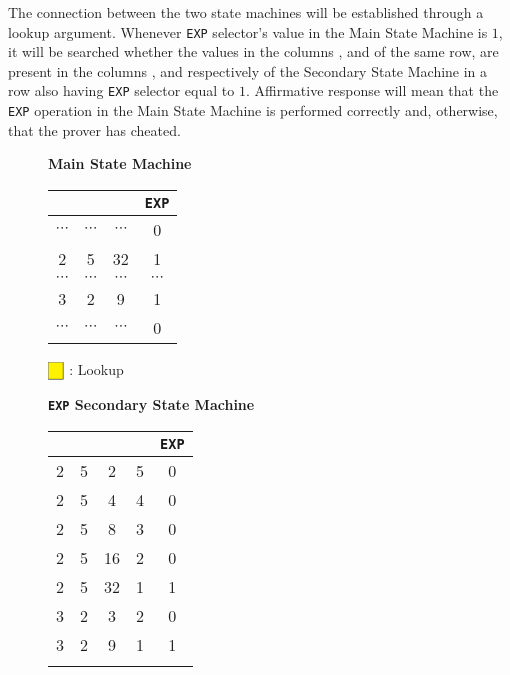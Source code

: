 The connection between the two state machines will be established through a lookup argument. Whenever \texttt{EXP} selector's value in the Main State Machine is $1$, it will be searched whether the values in the columns \A, \B and \C of the same row, are present in the columns \A, \B and \C respectively of the Secondary State Machine in a row also having \texttt{EXP} selector equal to $1$. Affirmative response will mean that the \texttt{EXP} operation in the Main State Machine is performed correctly and, otherwise, that the prover has cheated.

\begin{figure}[ht]
\begin{minipage}[t]{0.5\linewidth}
\centering
\textbf{Main State Machine} \\
\vspace{1em}
\begin{tabular}{|c|c|c|c|}
\hline
\A &  \B & \C &  \texttt{EXP}\\
\hline
$\cdots$ & $\cdots$ & $\cdots$ & 0 \\ \hline
2  \cellcolor{yellow} & 5 \cellcolor{yellow} &
32 \cellcolor{yellow} & 1 \cellcolor{yellow} \\
\hline
$\cdots$ & $\cdots$ & $\cdots$ & $\cdots$ \\ \hline
3  \cellcolor{yellow} & 2 \cellcolor{yellow} & 9
\cellcolor{yellow} & 1 \cellcolor{yellow} \\ \hline
$\cdots$ & $\cdots$ & $\cdots$ & 0 \\ \hline
\end{tabular}
\vspace{1em}
\begin{flushleft} \hspace{1.5cm}
$ \begin{array}{|c|}
  \hline \cellcolor{yellow} \\ \hline
\end{array}$
: Lookup
\end{flushleft}
\end{minipage}
\hspace{-3em}
\begin{minipage}[t]{0.5\linewidth}
\centering
\textbf{\texttt{EXP} Secondary State Machine} \\
\vspace{1em}
\begin{tabular}{|c|c|c|c|c|}
\hline
\A & \B & \C & \D
& \texttt{EXP} \\ \hline
2 & 5 & 2 & 5 & 0 \\ \hline
2 & 5 & 4 & 4 & 0 \\ \hline
2 & 5 & 8 & 3 & 0 \\ \hline
2 & 5 & 16 & 2 & 0 \\ \hline
2 \cellcolor{yellow} & 5 \cellcolor{yellow} &
32 \cellcolor{yellow} & 1 & 1
\cellcolor{yellow}\\ \hline
3 & 2 & 3 & 2 & 0 \\ \hline
3 \cellcolor{yellow} & 2 \cellcolor{yellow} & 9
\cellcolor{yellow} & 1 & 1 \cellcolor{yellow} \\ \hline
& & & & \\ \hline
\end{tabular}
\end{minipage}


\end{figure}
